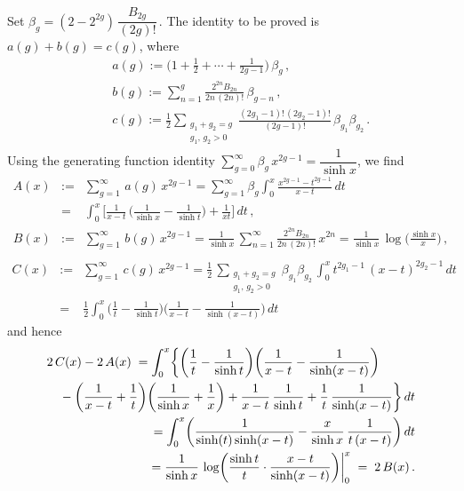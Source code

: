 \documentclass[11 pt]{amsart}
\begin{document}
\def\b{\beta}\def\s{\sinh}\def\f{\frac}\noindent
Set $\b_g=(2-2^{2g})\,\dfrac{B_{2g}}{(2g)!}\,$. The identity to be proved
is $a(g)+b(g)=c(g)$, where
\begin{eqnarray*}
&&a(g):=\biggl(1+\f12+\cdots+\f1{2g-1}\biggr)\,\b_g\,,\\
&&b(g):=\sum_{n=1}^g\f{2^{2n}B_{2n}}{2n\,(2n)!}\,\b_{g-n}\,,\\
&&c(g):=\f12\sum_{\substack{g_1+g_2=g\\g_1,\,g_2>0}}
 \f{(2g_1-1)!\,(2g_2-1)!}{(2g-1)!}\,\b_{g_1}\b_{g_2}\,.
\end{eqnarray*}
Using the generating function identity
$\sum\limits_{g=0}^\infty\b_g\,x^{2g-1}=\dfrac1{\s x}$, we find
\begin{eqnarray*}
A(x)&:=&\sum_{g=1}^\infty\,a(g)\,x^{2g-1}
  =\sum_{g=1}^\infty\b_g\int_0^x\f{x^{2g-1}-t^{2g-1}}{x-t}\,dt  \\
 &=&\int_0^x\biggl[\f1{x-t}\,\biggl(\f1{\s x}-\f1{\s t}\biggr)
   +\f1{xt}\biggr]\,dt\,,\\
B(x)&:=&\sum_{g=1}^\infty\,b(g)\,x^{2g-1}
  =\f1{\s x}\,\sum_{n=1}^\infty\f{2^{2n}B_{2n}}{2n\,(2n)!}\,x^{2n}
  =\f1{\s x}\,\log\bigl(\f{\s x}x\bigr)\,,\\
\end{eqnarray*}
\begin{eqnarray*}
C(x)&:=&\sum_{g=1}^\infty\,c(g)\,x^{2g-1}
  =\f12\,\sum_{\substack{g_1+g_2=g\\g_1,\,g_2>0}}\b_{g_1}\b_{g_2}\,
   \int_0^xt^{2g_1-1}\,(x-t)^{2g_2-1}\,dt\\
  &=&\f12\int_0^x\biggl(\f1t-\f1{\s t}\biggr)
  \biggl(\f1{x-t}-\f1{\s(x-t)}\biggr)\,dt
\end{eqnarray*}
and hence
\begin{eqnarray*}
\lefteqn{2\,C(x)-2\,A(x)\;=\int_0^x\biggl\{
\biggl(\f1t-\f1{\s t}\biggr)\biggl(\f1{x-t}-\f1{\s(x-t)}\biggr)}\\
&&\mbox{}-\biggl(\f1{x-t}+\f1t\biggr)\biggl(\f1{\s x}+\f1x\biggr)
  +\f1{x-t}\,\f1{\s t}+\f1t\,\f1{\s(x-t)}\biggr\}\,dt\\
&&=\int_0^x\biggl(\f1{\s(t)\s(x-t)}-\f x{\s x}\,\f1{t\,(x-t)}\biggr)\,dt\\
&&=\f1{\s x}\,\log\biggl(\f{\s t}t\cdot\f{x-t}{\s(x-t)}\biggr)
 \biggl.\biggr|_0^x\;=\;2\,B(x)\,.
\end{eqnarray*}
\end{document}

